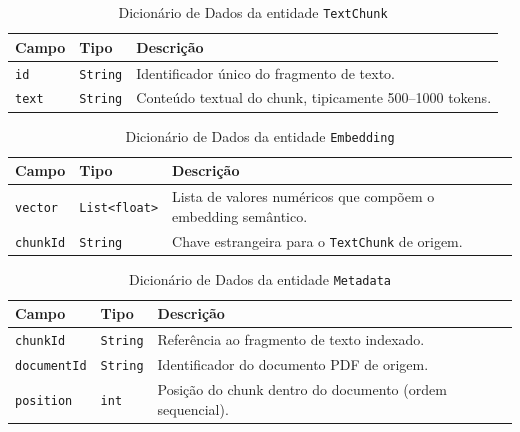 \begin{description}
\begin{table}[H]
  \centering
  \caption{Dicionário de Dados da entidade \texttt{TextChunk}}
  \label{tab:dd_textchunk}
  \begin{tabular}{|p{3cm}|p{4cm}|p{8cm}|}
    \hline
    \textbf{Campo} & \textbf{Tipo} & \textbf{Descrição} \\ \hline
    \texttt{id}    & \texttt{String} & Identificador único do fragmento de texto. \\ \hline
    \texttt{text}  & \texttt{String} & Conteúdo textual do chunk, tipicamente 500–1000 tokens. \\ \hline
  \end{tabular}
\end{table}

\begin{table}[H]
  \centering
  \caption{Dicionário de Dados da entidade \texttt{Embedding}}
  \label{tab:dd_embedding}
  \begin{tabular}{|p{3cm}|p{4cm}|p{8cm}|}
    \hline
    \textbf{Campo}     & \textbf{Tipo}            & \textbf{Descrição} \\ \hline
    \texttt{vector}     & \texttt{List<float>}     & Lista de valores numéricos que compõem o embedding semântico. \\ \hline
    \texttt{chunkId}    & \texttt{String}          & Chave estrangeira para o \texttt{TextChunk} de origem. \\ \hline
  \end{tabular}
\end{table}

\begin{table}[H]
  \centering
  \caption{Dicionário de Dados da entidade \texttt{Metadata}}
  \label{tab:dd_metadata}
  \begin{tabular}{|p{3cm}|p{4cm}|p{8cm}|}
    \hline
    \textbf{Campo}       & \textbf{Tipo}   & \textbf{Descrição} \\ \hline
    \texttt{chunkId}      & \texttt{String} & Referência ao fragmento de texto indexado. \\ \hline
    \texttt{documentId}   & \texttt{String} & Identificador do documento PDF de origem. \\ \hline
    \texttt{position}     & \texttt{int}    & Posição do chunk dentro do documento (ordem sequencial). \\ \hline
  \end{tabular}
\end{table}


\end{description}
